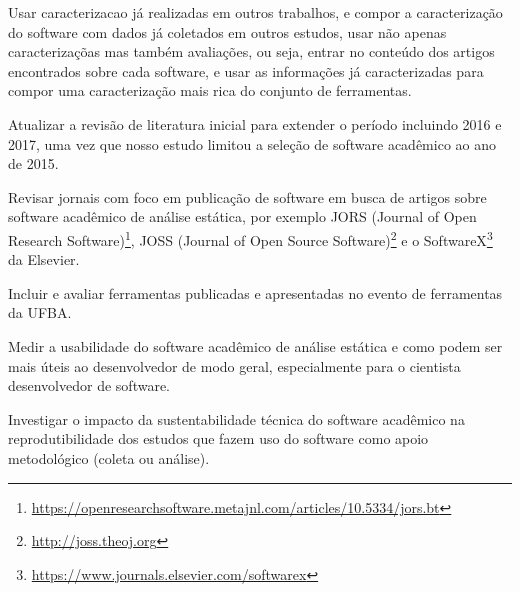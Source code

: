 
Usar caracterizacao já realizadas em outros trabalhos, e compor a
caracterização do software com dados já coletados em outros estudos, usar não
apenas caracterizaçõas mas também avaliações, ou seja, entrar no conteúdo dos
artigos encontrados sobre cada software, e usar as informações já
caracterizadas para compor uma caracterização mais rica do conjunto de
ferramentas.


Atualizar a revisão de literatura inicial para extender o período incluindo
2016 e 2017, uma vez que nosso estudo limitou a seleção de software acadêmico
ao ano de 2015.

Revisar jornais com foco em publicação de software em busca de artigos sobre
software acadêmico de análise estática, por exemplo JORS (Journal of Open
Research
Software)\footnote{\url{https://openresearchsoftware.metajnl.com/articles/10.5334/jors.bt}},
JOSS (Journal of Open Source Software)\footnote{\url{http://joss.theoj.org}} e o
SoftwareX\footnote{\url{https://www.journals.elsevier.com/softwarex}} da
Elsevier. 

Incluir e avaliar ferramentas publicadas e apresentadas no evento de
ferramentas da UFBA.

Medir a usabilidade do software acadêmico de análise estática e como podem ser
mais úteis ao desenvolvedor de modo geral, especialmente para o cientista
desenvolvedor de software.

Investigar o impacto da sustentabilidade técnica do software acadêmico na
reprodutibilidade dos estudos que fazem uso do software como apoio metodológico
(coleta ou análise).
